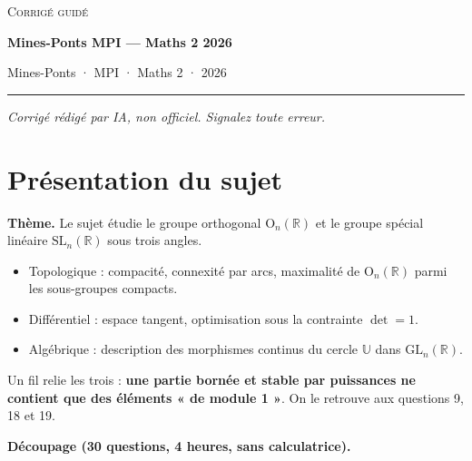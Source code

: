 \documentclass[11pt,a4paper]{article}
\providecommand{\tightlist}{\setlength{\itemsep}{0pt}\setlength{\parskip}{0pt}}
\begin{document}
\thispagestyle{plain}
\begin{center}
  {\small\scshape Corrigé guidé}\par\smallskip
  {\LARGE\bfseries Mines-Ponts MPI — Maths 2 2026\par}\medskip
  {\large Mines-Ponts · MPI · Maths 2 · 2026\par}
\end{center}
\vspace{2pt}\hrule\vspace{8pt}

\emph{Corrigé rédigé par IA, non officiel. Signalez toute erreur.}

\hypertarget{pruxe9sentation-du-sujet}{%
\section{Présentation du sujet}\label{pruxe9sentation-du-sujet}}

\textbf{Thème.} Le sujet étudie le groupe orthogonal \({\mathrm{O}}_n(\mathbb R)\) et le groupe spécial linéaire \({\mathrm{SL}}_n(\mathbb R)\) sous trois angles.

\begin{itemize}
\tightlist
\item
  Topologique : compacité, connexité par arcs, maximalité de \({\mathrm{O}}_n(\mathbb R)\) parmi les sous-groupes compacts.
\item
  Différentiel : espace tangent, optimisation sous la contrainte \(\det=1\).
\item
  Algébrique : description des morphismes continus du cercle \(\mathbb U\) dans \({\mathrm{GL}}_n(\mathbb R)\).
\end{itemize}

Un fil relie les trois : \textbf{une partie bornée et stable par puissances ne contient que des éléments « de module 1 »}. On le retrouve aux questions 9, 18 et 19.

\textbf{Découpage (30 questions, 4 heures, sans calculatrice).}
\end{document}
